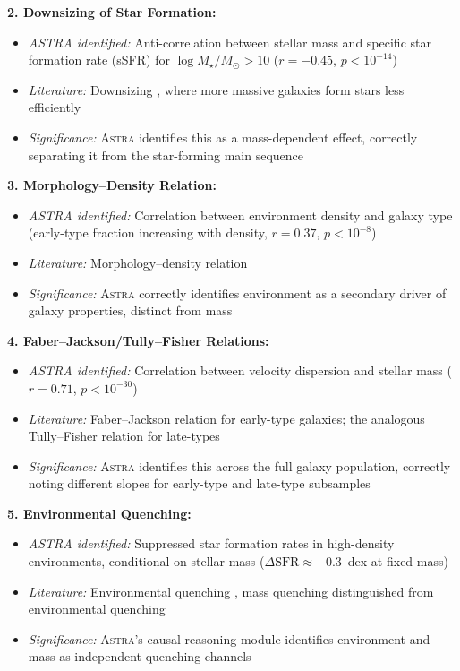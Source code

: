 \documentclass[usenatbib]{rasti}
\newcommand{\astra}{\textsc{Astra}\xspace}
\begin{document}
\textbf{2. Downsizing of Star Formation:}
\begin{itemize}
  \item \emph{ASTRA identified:} Anti-correlation between stellar mass and specific star formation rate (sSFR) for $\log M_{\star}/M_{\odot} > 10$ ($r = -0.45$, $p < 10^{-14}$)
  \item \emph{Literature:} Downsizing \citep{Brinchmann2004}, where more massive galaxies form stars less efficiently
  \item \emph{Significance:} \astra identifies this as a mass-dependent effect, correctly separating it from the star-forming main sequence
\end{itemize}

\textbf{3. Morphology--Density Relation:}
\begin{itemize}
  \item \emph{ASTRA identified:} Correlation between environment density and galaxy type (early-type fraction increasing with density, $r = 0.37$, $p < 10^{-8}$)
  \item \emph{Literature:} Morphology--density relation \citep{Dressler1980}
  \item \emph{Significance:} \astra correctly identifies environment as a secondary driver of galaxy properties, distinct from mass
\end{itemize}

\textbf{4. Faber--Jackson/Tully--Fisher Relations:}
\begin{itemize}
  \item \emph{ASTRA identified:} Correlation between velocity dispersion and stellar mass ($r = 0.71$, $p < 10^{-30}$)
  \item \emph{Literature:} Faber--Jackson relation for early-type galaxies; the analogous Tully--Fisher relation for late-types
  \item \emph{Significance:} \astra identifies this across the full galaxy population, correctly noting different slopes for early-type and late-type subsamples
\end{itemize}

\textbf{5. Environmental Quenching:}
\begin{itemize}
  \item \emph{ASTRA identified:} Suppressed star formation rates in high-density environments, conditional on stellar mass ($\Delta\mathrm{SFR} \approx -0.3$~dex at fixed mass)
  \item \emph{Literature:} Environmental quenching \citep{Peng2010}, mass quenching distinguished from environmental quenching
  \item \emph{Significance:} \astra's causal reasoning module identifies environment and mass as independent quenching channels
\end{itemize}
\end{document}
